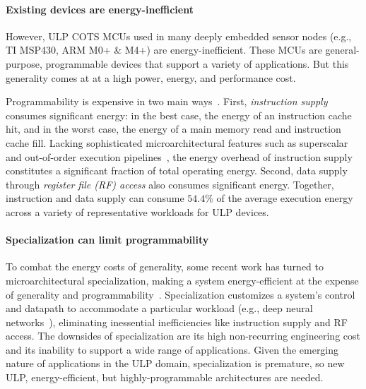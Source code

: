 \paragraph{Existing devices are energy-inefficient}
However, ULP COTS MCUs used in many deeply embedded sensor nodes
(e.g., TI MSP430, ARM M0+ \& M4+) are energy-inefficient.
%
These MCUs are general-purpose, programmable devices that support a variety of
applications.
% 
But this generality comes at at a high power, energy, and performance cost.

Programmability is expensive in two main ways~\cite{horowitz:isscc14:energy-keynote,hameed2010understanding,balfour_elm_thesis}.
First, \emph{instruction supply} consumes significant energy: in the best case, the energy of
an instruction cache hit, and in the worst case, the energy of a main memory
read and instruction cache fill.  
%
Lacking sophisticated microarchitectural features such as superscalar and
out-of-order execution pipelines~\cite{msp430fr5994,traber2016pulpino}, the energy overhead of
instruction supply constitutes a significant fraction of total operating energy.
%
Second, data supply through \emph{register file (RF) access} also consumes significant energy.
%
Together, instruction and data supply can consume
$54.4\%$ of the average execution energy across a variety of representative workloads for ULP devices.

\paragraph{Specialization can limit programmability}
To combat the energy costs of generality, some recent work has turned to
microarchitectural specialization, making a system energy-efficient at the
expense of generality and
programmability~\cite{chen:isca16:eyeriss,chen:asplos14:diannao,du:isca15:shidiannao,liu:isca15:pudiannao,chen2014dadiannao,venkatesh2010conservation}.
% 
Specialization customizes a system's control and datapath to accommodate a
particular workload (e.g., deep neural networks~\cite{chen:isca16:eyeriss,chen:asplos14:diannao}),
eliminating inessential inefficiencies like instruction supply and RF access.
% 
The downsides of specialization are its high non-recurring engineering cost and its inability to support a wide range of applications.
% 
Given the emerging nature of applications in the ULP domain, specialization is premature, so new ULP, energy-efficient, but highly-programmable architectures are needed.

